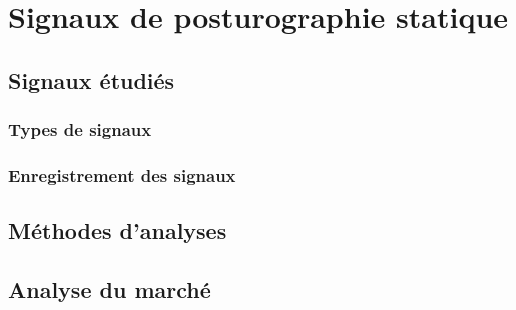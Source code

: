 \section{Signaux de posturographie statique}

\subsection{Signaux étudiés}

\subsubsection{Types de signaux}
\subsubsection{Enregistrement des signaux}

\subsection{Méthodes d'analyses}

\subsection{Analyse du marché}